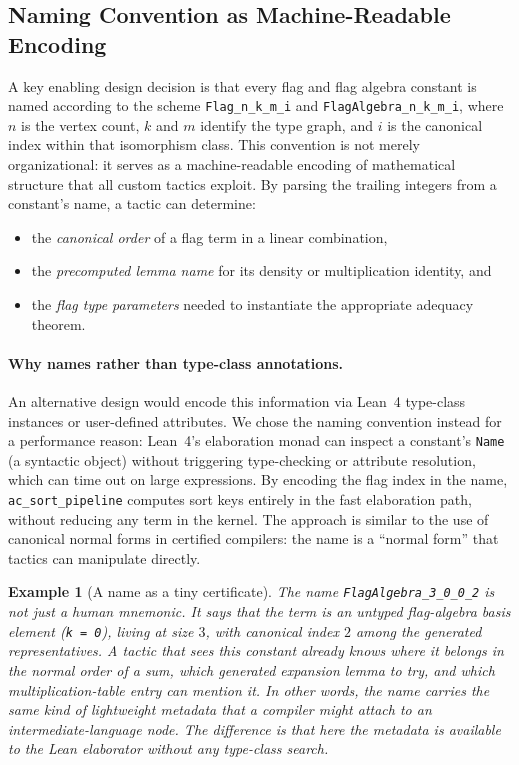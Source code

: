 \documentclass{article}
\newtheorem{example}[theorem]{Example}
\newcommand{\lean}[1]{\texttt{#1}}
\begin{document}
\subsection{Naming Convention as Machine-Readable Encoding}

A key enabling design decision is that every flag and flag algebra constant is
named according to the scheme \lean{Flag\_n\_k\_m\_i} and
\lean{FlagAlgebra\_n\_k\_m\_i}, where $n$ is the vertex count, $k$ and $m$
identify the type graph, and $i$ is the canonical index within that
isomorphism class.  This convention is not merely organizational: it serves as
a machine-readable encoding of mathematical structure that all custom tactics
exploit.  By parsing the trailing integers from a constant's name, a tactic can
determine:
\begin{itemize}
  \item the \emph{canonical order} of a flag term in a linear combination,
  \item the \emph{precomputed lemma name} for its density or multiplication
    identity, and
  \item the \emph{flag type parameters} needed to instantiate the appropriate
    adequacy theorem.
\end{itemize}

\paragraph{Why names rather than type-class annotations.}
An alternative design would encode this information via Lean~4 type-class
instances or user-defined attributes.  We chose the naming convention instead
for a performance reason: Lean~4's elaboration monad can inspect a constant's
\lean{Name} (a syntactic object) without triggering type-checking or
attribute resolution, which can time out on large expressions.  By encoding
the flag index in the name, \lean{ac\_sort\_pipeline} computes sort keys
entirely in the fast elaboration path, without reducing any term in the kernel.
The approach is similar to the use of canonical normal forms in certified
compilers: the name is a ``normal form'' that tactics can manipulate directly.

\begin{example}[A name as a tiny certificate]
  The name \lean{FlagAlgebra\_3\_0\_0\_2} is not just a human mnemonic.  It says
  that the term is an untyped flag-algebra basis element (\lean{k = 0}), living
  at size $3$, with canonical index $2$ among the generated representatives.
  A tactic that sees this constant already knows where it belongs in the
  normal order of a sum, which generated expansion lemma to try, and which
  multiplication-table entry can mention it.  In other words, the name carries
  the same kind of lightweight metadata that a compiler might attach to an
  intermediate-language node.  The difference is that here the metadata is
  available to the Lean elaborator without any type-class search.
\end{example}
\end{document}
